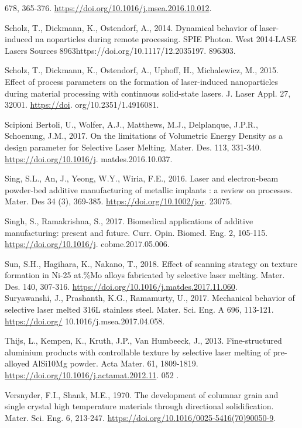 \documentclass[10pt]{article}
\begin{document}
678, 365-376. \href{https://doi.org/10.1016/j.msea.2016.10.012}{https://doi.org/10.1016/j.msea.2016.10.012}.

Scholz, T., Dickmann, K., Ostendorf, A., 2014. Dynamical behavior of laser-induced na noparticles during remote processing. SPIE Photon. West 2014-LASE Lasers Sources 8963https://doi.org/10.1117/12.2035197. 896303.

Scholz, T., Dickmann, K., Ostendorf, A., Uphoff, H., Michalewicz, M., 2015. Effect of process parameters on the formation of laser-induced nanoparticles during material processing with continuous solid-state lasers. J. Laser Appl. 27, 32001. \href{https://doi}{https://doi}. org/10.2351/1.4916081.

Scipioni Bertoli, U., Wolfer, A.J., Matthews, M.J., Delplanque, J.P.R., Schoenung, J.M., 2017. On the limitations of Volumetric Energy Density as a design parameter for Selective Laser Melting. Mater. Des. 113, 331-340. \href{https://doi.org/10.1016/j}{https://doi.org/10.1016/j}. matdes.2016.10.037.

Sing, S.L., An, J., Yeong, W.Y., Wiria, F.E., 2016. Laser and electron-beam powder-bed additive manufacturing of metallic implants : a review on processes. Mater. Des 34 (3), 369-385. \href{https://doi.org/10.1002/jor}{https://doi.org/10.1002/jor}. 23075.

Singh, S., Ramakrishna, S., 2017. Biomedical applications of additive manufacturing: present and future. Curr. Opin. Biomed. Eng. 2, 105-115. \href{https://doi.org/10.1016/j}{https://doi.org/10.1016/j}. cobme.2017.05.006.

Sun, S.H., Hagihara, K., Nakano, T., 2018. Effect of scanning strategy on texture formation in Ni-25 at.\%Mo alloys fabricated by selective laser melting. Mater. Des. 140, 307-316. \href{https://doi.org/10.1016/j.matdes.2017.11.060}{https://doi.org/10.1016/j.matdes.2017.11.060}.\\
Suryawanshi, J., Prashanth, K.G., Ramamurty, U., 2017. Mechanical behavior of selective laser melted 316L stainless steel. Mater. Sci. Eng. A 696, 113-121. \href{https://doi.org/}{https://doi.org/} 10.1016/j.msea.2017.04.058.

Thijs, L., Kempen, K., Kruth, J.P., Van Humbeeck, J., 2013. Fine-structured aluminium products with controllable texture by selective laser melting of pre-alloyed AlSi10Mg powder. Acta Mater. 61, 1809-1819. \href{https://doi.org/10.1016/j.actamat.2012.11}{https://doi.org/10.1016/j.actamat.2012.11}. 052 .

Versnyder, F.I., Shank, M.E., 1970. The development of columnar grain and single crystal high temperature materials through directional solidification. Mater. Sci. Eng. 6, 213-247. \href{https://doi.org/10.1016/0025-5416(70)90050-9}{https://doi.org/10.1016/0025-5416(70)90050-9}.
\end{document}
